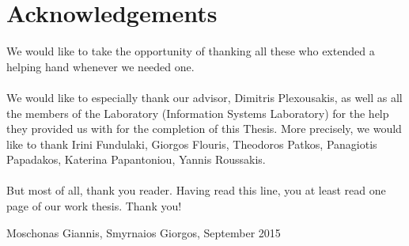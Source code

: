 \thispagestyle{plain}			%
\section*{Acknowledgements}
We would like to take the opportunity of thanking all these who extended a helping hand
whenever we needed one.\\
\\
We would like to especially thank our advisor, Dimitris Plexousakis, as well as all the members of the Laboratory (Information Systems Laboratory) for the help they provided us with for the completion of this Thesis. More precisely, we would like to thank Irini Fundulaki, Giorgos Flouris, Theodoros Patkos, Panagiotis Papadakos, Katerina Papantoniou, Yannis Roussakis.\\
\\
But most of all, thank you reader. Having read this line, you at least read one page
of our work thesis. Thank you!

\vspace{1.5cm}
\hfill
Moschonas Giannis, Smyrnaios Giorgos, September 2015

\newpage				%
\thispagestyle{empty}
\mbox{}